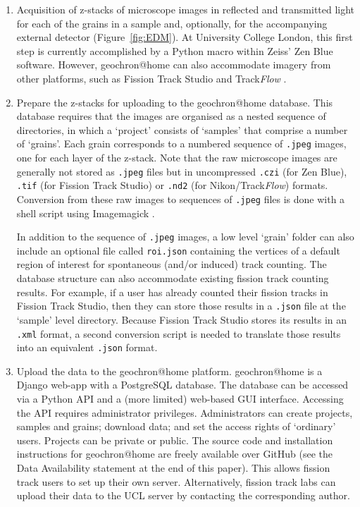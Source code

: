 \documentclass[gchron, manuscript]{copernicus}
\begin{document}
\begin{enumerate}
\item Acquisition of z-stacks of microscope images in reflected and
  transmitted light for each of the grains in a sample and,
  optionally, for the accompanying external detector
  (Figure~\ref{fig:EDM}). At University College London, this first
  step is currently accomplished by a Python macro within Zeiss' Zen
  Blue software.  However, geochron@home can also accommodate imagery
  from other platforms, such as Fission Track Studio
  \citep[Zeiss;][]{gleadow2009} and Track\emph{Flow}
  \citep[Nikon;][]{vanranst2019}.

\item Prepare the z-stacks for uploading to the geochron@home
  database. This database requires that the images are organised as a
  nested sequence of directories, in which a `project' consists of
  `samples' that comprise a number of `grains'.  Each grain
  corresponds to a numbered sequence of \texttt{.jpeg} images, one for
  each layer of the z-stack. Note that the raw microscope images are
  generally not stored as \texttt{.jpeg} files but in uncompressed
  \texttt{.czi} (for Zen Blue), \texttt{.tif} (for Fission Track
  Studio) or \texttt{.nd2} (for Nikon/Track\emph{Flow})
  formats. Conversion from these raw images to sequences of
  \texttt{.jpeg} files is done with a shell script using Imagemagick
  \citep{still2006}.\medskip

In addition to the sequence of \texttt{.jpeg} images, a low level
`grain' folder can also include an optional file called
\texttt{roi.json} containing the vertices of a default region of
interest for spontaneous (and/or induced) track counting. The database
structure can also accommodate existing fission track counting
results.  For example, if a user has already counted their fission
tracks in Fission Track Studio, then they can store those results in a
\texttt{.json} file at the `sample' level directory. Because Fission
Track Studio stores its results in an \texttt{.xml} format, a second
conversion script is needed to translate those results into an
equivalent \texttt{.json} format.

\item Upload the data to the geochron@home platform. geochron@home is
  a Django web-app with a PostgreSQL database. The database can be
  accessed via a Python API and a (more limited) web-based GUI
  interface. Accessing the API requires administrator
  privileges. Administrators can create projects, samples and grains;
  download data; and set the access rights of `ordinary' users.
  Projects can be private or public. The source code and installation
  instructions for geochron@home are freely available over GitHub (see
  the Data Availability statement at the end of this paper). This
  allows fission track users to set up their own
  server. Alternatively, fission track labs can upload their data to
  the UCL server by contacting the corresponding author.


\end{enumerate}
\end{document}
